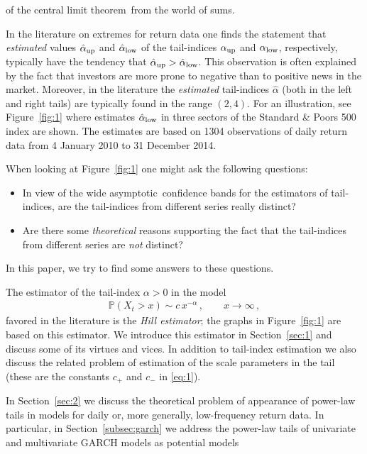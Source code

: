\documentclass[11pt,a4]{amsart}
\newcommand{\red}{\color{darkred}}
\newcommand{\clt}{central limit theorem}
\newcommand{\asy}{asymptotic}
\newcommand{\fre}{frequenc}
\newcommand{\beao}{\begin{eqnarray*}}
\newcommand{\eeao}{\end{eqnarray*}\noindent}
\newcommand{\xto}{x\to\infty}
\renewcommand{\P }{{\mathbb P}}
\newcommand{\1}{{\mathbf 1}}
\begin{document}
of the \clt\ from the world of sums.
\par
In the literature on extremes for return data one finds the 
statement that {\em estimated} values $\hat \alpha_{\rm up}$ and $\hat \alpha_{\rm low}$ 
of the tail-indices $\alpha_{\rm up}$ and $\alpha_{\rm low}$,
respectively, typically have the tendency that $\hat \alpha_{\rm
  up}>\hat \alpha_{\rm low}$. 
This observation is often explained by the fact that investors are
more prone to negative than to positive news in the market. 
Moreover, in the literature the {\em estimated} tail-indices $\hat \alpha$ (both in the left and right tails) 
are typically found in the range $(2,4)$. For an illustration, see
Figure~\ref{fig:1} where estimates $\hat \alpha_{\rm low}$ 
in three sectors of the Standard \& Poors 500 index  are shown. The
estimates are based on 1304 observations of daily return 
data from 4 January 2010 to 31 December 2014.
\par
When looking at Figure~\ref{fig:1} one might ask the following questions:
\begin{itemize}
\item
In view of the wide \asy\ confidence bands for the estimators of tail-indices, 
are the tail-indices from different series really distinct?
\item
Are there some {\em theoretical} reasons supporting the fact that the tail-indices from different series are {\em not} 
distinct?
\end{itemize}
In this paper, we try to find some answers to these questions. 
\par
The estimator of the tail-index $\alpha>0$  in the model
\beao
\P(X_t>x)\sim c\,x^{-\alpha}\,,\qquad \xto\,,
\eeao
favored in the literature  is the {\em Hill estimator}; the graphs in 
Figure~\ref{fig:1} are based on this estimator. We introduce this estimator in Section~\ref{sec:1} and discuss 
some of its virtues and vices. In addition to tail-index estimation we also discuss the related problem of
estimation of the scale parameters in the tail (these are the constants $c_+$ and $c_-$ in \eqref{eq:1}). 
\par
In Section~\ref{sec:2} we discuss the theoretical problem of appearance of power-law tails in models 
for daily or, more generally, low-\fre y 
return data. In particular, in Section~\ref{subsec:garch} we address the power-law tails of univariate and multivariate GARCH models as potential models
\end{document}

